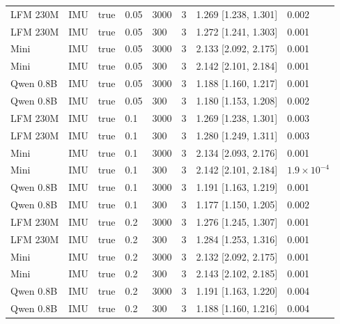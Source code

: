 {\begin{longtable}{@{}llllllll@{}}
LFM 230M & IMU & true & 0.05 & 3000 & 3 & 1.269 [1.238, 1.301] & 0.002 \\
LFM 230M & IMU & true & 0.05 & 300 & 3 & 1.272 [1.241, 1.303] & 0.001 \\
Mini & IMU & true & 0.05 & 3000 & 3 & 2.133 [2.092, 2.175] & 0.001 \\
Mini & IMU & true & 0.05 & 300 & 3 & 2.142 [2.101, 2.184] & 0.001 \\
Qwen 0.8B & IMU & true & 0.05 & 3000 & 3 & 1.188 [1.160, 1.217] & 0.001 \\
Qwen 0.8B & IMU & true & 0.05 & 300 & 3 & 1.180 [1.153, 1.208] & 0.002 \\
LFM 230M & IMU & true & 0.1 & 3000 & 3 & 1.269 [1.238, 1.301] & 0.003 \\
LFM 230M & IMU & true & 0.1 & 300 & 3 & 1.280 [1.249, 1.311] & 0.003 \\
Mini & IMU & true & 0.1 & 3000 & 3 & 2.134 [2.093, 2.176] & 0.001 \\
Mini & IMU & true & 0.1 & 300 & 3 & 2.142 [2.101, 2.184] & $1.9\times10^{-4}$ \\
Qwen 0.8B & IMU & true & 0.1 & 3000 & 3 & 1.191 [1.163, 1.219] & 0.001 \\
Qwen 0.8B & IMU & true & 0.1 & 300 & 3 & 1.177 [1.150, 1.205] & 0.002 \\
LFM 230M & IMU & true & 0.2 & 3000 & 3 & 1.276 [1.245, 1.307] & 0.001 \\
LFM 230M & IMU & true & 0.2 & 300 & 3 & 1.284 [1.253, 1.316] & 0.001 \\
Mini & IMU & true & 0.2 & 3000 & 3 & 2.132 [2.092, 2.175] & 0.001 \\
Mini & IMU & true & 0.2 & 300 & 3 & 2.143 [2.102, 2.185] & 0.001 \\
Qwen 0.8B & IMU & true & 0.2 & 3000 & 3 & 1.191 [1.163, 1.220] & 0.004 \\
Qwen 0.8B & IMU & true & 0.2 & 300 & 3 & 1.188 [1.160, 1.216] & 0.004 \\
\bottomrule
\end{longtable}}\par

